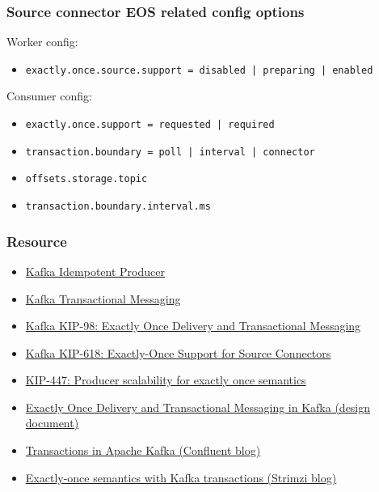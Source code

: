 \documentclass[10pt,utf8]{beamer}
\begin{document}
\begin{frame}
    \frametitle{Source connector EOS related config options}
    Worker config:
    \begin{itemize}
        \item \texttt{exactly.once.source.support = disabled | preparing | enabled}
    \end{itemize}
    
    \vspace{0.5cm}
    
    Consumer config:
    \begin{itemize}
     \item \texttt{exactly.once.support = requested | required}
     \item \texttt{transaction.boundary = poll | interval | connector}
     \item \texttt{offsets.storage.topic}
     \item \texttt{transaction.boundary.interval.ms}
    \end{itemize}
\end{frame}

\begin{frame}
    \frametitle{Resource}
    \begin{itemize}
        \color{blue}
        \item \href{https://cwiki.apache.org/confluence/display/KAFKA/Idempotent+Producer}{Kafka Idempotent Producer}
        \item \href{https://cwiki.apache.org/confluence/display/KAFKA/Transactional+Messaging+in+Kafka}{Kafka Transactional Messaging}
        \item \href{https://cwiki.apache.org/confluence/display/KAFKA/KIP-98+-+Exactly+Once+Delivery+and+Transactional+Messaging}{Kafka KIP-98: Exactly Once Delivery and Transactional Messaging}
        \item \href{https://cwiki.apache.org/confluence/display/KAFKA/KIP-618\%3A+Exactly-Once+Support+for+Source+Connectors}{Kafka KIP-618: Exactly-Once Support for Source Connectors}
        \item \href{https://cwiki.apache.org/confluence/display/KAFKA/KIP-447\%3A+Producer+scalability+for+exactly+once+semantics}{KIP-447: Producer scalability for exactly once semantics}
        \item \href{https://docs.google.com/document/d/11Jqy\_GjUGtdXJK94XGsEIK7CP1SnQGdp2eF0wSw9ra8/edit\#heading=h.xq0ee1vnpz4o}{Exactly Once Delivery and Transactional Messaging in Kafka (design document)}
        \item \href{https://www.confluent.io/blog/transactions-apache-kafka/}{Transactions in Apache Kafka (Confluent blog)}
        \item \href{https://strimzi.io/blog/2023/05/03/kafka-transactions/}{Exactly-once semantics with Kafka transactions (Strimzi blog)}
        \color{black}
    \end{itemize}
\end{frame}
\end{document}
